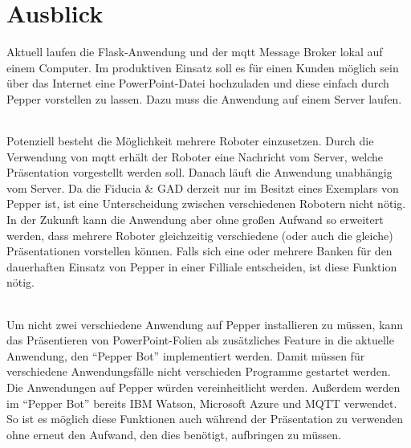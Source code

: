 \chapter{Ausblick}\label{sec:ausblick}
Aktuell laufen die Flask-Anwendung und der \ac{mqtt} Message Broker lokal auf
einem Computer. Im produktiven Einsatz soll es für einen Kunden möglich sein über das
Internet eine PowerPoint-Datei hochzuladen und diese einfach durch Pepper
vorstellen zu lassen. Dazu muss die Anwendung auf einem Server laufen.

\subparagraph{}
Potenziell besteht die Möglichkeit mehrere Roboter einzusetzen. Durch die
Verwendung von \ac{mqtt} erhält der Roboter eine Nachricht vom Server, welche
Präsentation vorgestellt werden soll. Danach läuft die Anwendung unabhängig vom
Server. Da die Fiducia \& GAD derzeit nur im Besitzt eines Exemplars von Pepper
ist, ist eine Unterscheidung zwischen verschiedenen Robotern nicht nötig. In der
Zukunft kann die Anwendung aber ohne großen Aufwand so erweitert werden, dass
mehrere Roboter gleichzeitig verschiedene (oder auch die gleiche) Präsentationen
vorstellen können. Falls sich eine oder mehrere Banken für den dauerhaften
Einsatz von Pepper in einer Filliale entscheiden, ist diese Funktion nötig.

\subparagraph{}
Um nicht zwei verschiedene Anwendung auf Pepper installieren zu müssen, kann das
Präsentieren von PowerPoint-Folien als zusätzliches Feature in die aktuelle
Anwendung, den "`Pepper Bot"' implementiert werden. Damit müssen für
verschiedene Anwendungsfälle nicht verschieden Programme gestartet werden. Die
Anwendungen auf Pepper würden vereinheitlicht werden. Außerdem werden im
"`Pepper Bot"' bereits IBM Watson, Microsoft Azure und MQTT verwendet. So ist es
möglich diese Funktionen auch während der Präsentation zu verwenden ohne erneut
den Aufwand, den dies benötigt, aufbringen zu müssen.
